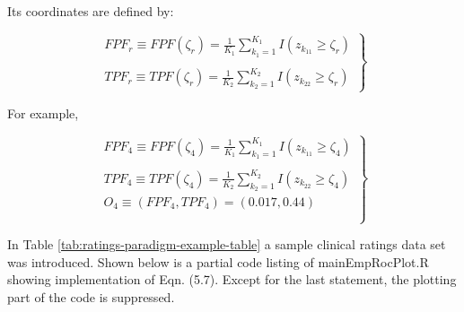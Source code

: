 \documentclass[
]{book}
\begin{document}
Its coordinates are defined by:

\begin{equation} 
\left.
\begin{aligned}
FPF_r \equiv FPF\left ( \zeta_r \right )=\frac {1} {K_1} \sum_{k_1=1}^{K_1}I \left ( z_{k_11} \geq  \zeta_r\right ) \\
\\
TPF_r \equiv TPF\left ( \zeta_r \right )=\frac {1} {K_2} \sum_{k_2=1}^{K_2} I\left ( z_{k_22} \geq  \zeta_r\right )
\end{aligned}
\right \}
\label{eq:empirical-OperatingPointFPF-TPF-r}
\end{equation}

For example,

\begin{equation} 
\left.
\begin{aligned}
FPF_4 \equiv FPF\left ( \zeta_4 \right )=\frac {1} {K_1} \sum_{k_1=1}^{K_1}I \left ( z_{k_11} \geq  \zeta_4\right ) \\
\\
TPF_4 \equiv TPF\left ( \zeta_4 \right )=\frac {1} {K_2} \sum_{k_2=1}^{K_2} I\left ( z_{k_22} \geq  \zeta_4\right )
\\
O_4 \equiv \left ( FPF_4, TPF_4 \right ) = \left ( 0.017, 0.44 \right )\\
\\
\end{aligned}
\right \}
\label{eq:empirical-OperatingPointFPF-TPF-4}
\end{equation}

In Table \ref{tab:ratings-paradigm-example-table} a sample clinical ratings data set was introduced. Shown below is a partial code listing of mainEmpRocPlot.R showing implementation of Eqn. (5.7). Except for the last statement, the plotting part of the code is suppressed.
\end{document}
